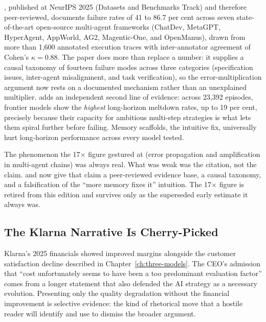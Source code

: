 \textcite{Cemri2025}, published at NeurIPS 2025 (Datasets and Benchmarks Track) and therefore peer-reviewed, documents failure rates of 41 to 86.7 per cent across seven state-of-the-art open-source multi-agent frameworks (ChatDev, MetaGPT, HyperAgent, AppWorld, AG2, Magentic-One, and OpenManus), drawn from more than 1,600 annotated execution traces with inter-annotator agreement of Cohen's $\kappa = 0.88$. The paper does more than replace a number: it supplies a causal taxonomy of fourteen failure modes across three categories (specification issues, inter-agent misalignment, and task verification), so the error-multiplication argument now rests on a documented mechanism rather than an unexplained multiplier. \parencite{Khanal2026} adds an independent second line of evidence: across 23,392 episodes, frontier models show the \emph{highest} long-horizon meltdown rates, up to 19 per cent, precisely because their capacity for ambitious multi-step strategies is what lets them spiral further before failing. Memory scaffolds, the intuitive fix, universally hurt long-horizon performance across every model tested.

\begin{cautionbox}[title={What Changed}]
The phenomenon the 17$\times$ figure gestured at (error propagation and amplification in multi-agent chains) was always real. What was weak was the citation, not the claim. \parencite{Cemri2025} and \parencite{Khanal2026} now give that claim a peer-reviewed evidence base, a causal taxonomy, and a falsification of the ``more memory fixes it'' intuition. The 17$\times$ figure is retired from this edition and survives only as the superseded early estimate it always was.
\end{cautionbox}

\subsection{The Klarna Narrative Is Cherry-Picked}

Klarna's 2025 financials showed improved margins alongside the customer satisfaction decline described in Chapter~\ref{ch:three-models}. The CEO's admission that ``cost unfortunately seems to have been a too predominant evaluation factor'' \parencite{Klarna2025} comes from a longer statement that also defended the AI strategy as a necessary evolution. Presenting only the quality degradation without the financial improvement is selective evidence: the kind of rhetorical move that a hostile reader will identify and use to dismiss the broader argument.

